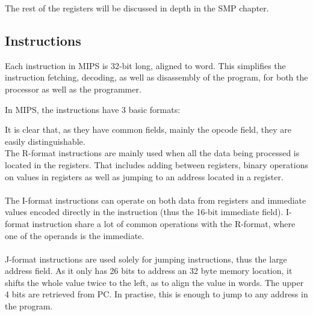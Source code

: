The rest of the registers will be discussed in depth in the SMP chapter.


\subsection{Instructions}
Each instruction in MIPS is 32-bit long, aligned to word. This simplifies the
instruction fetching, decoding, as well as disassembly of the program,
for both
the processor as well as the programmer.

In MIPS, the instructions have 3 basic formats:
\begin{figure}[H]
\centering
{}
\label{fig:instruction_formats}
\end{figure}

It is clear that, as they have common fields, mainly the opcode field,
they are
easily distinguishable.\\
The R-format instructions are mainly used when all the data being processed is
located in the registers. That includes adding between registers, binary
operations on values in registers as well as jumping to an address located in
a register.\\\\
The I-format instructions can operate on both data from registers and
immediate
values encoded directly in the instruction (thus the 16-bit immediate field).
I-format instruction share a lot of common operations with the R-format, where
one of the operands is the immediate.\\\\
J-format instructions are used solely for jumping instructions, thus the large
address field. As it only has 26 bits to address an 32 byte memory location, it
shifts the whole value twice to the left, as to align the value in words. The
upper 4 bits are retrieved from PC. In practise, this is enough to jump to any
address in the program.

